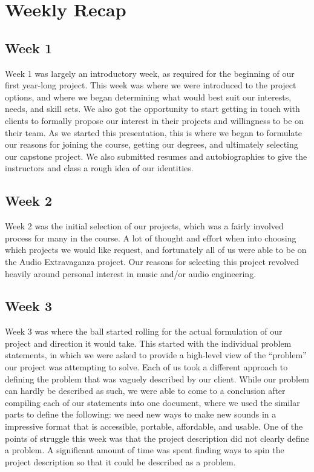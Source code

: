 \section{Weekly Recap}
    \subsection{Week 1}
        Week 1 was largely an introductory week, as required for the beginning of our first year-long project.
        This week was where we were introduced to the project options, and where we began determining what would best suit our interests, needs, and skill sets.
        We also got the opportunity to start getting in touch with clients to formally propose our interest in their projects and willingness to be on their team.
        As we started this presentation, this is where we began to formulate our reasons for joining the course, getting our degrees, and ultimately selecting our capstone project.
        We also submitted resumes and autobiographies to give the instructors and class a rough idea of our identities. 
    \subsection{Week 2}
        Week 2 was the initial selection of our projects, which was a fairly involved process for many in the course.
        A lot of thought and effort when into choosing which projects we would like request, and fortunately all of us were able to be on the Audio Extravaganza project.
        Our reasons for selecting this project revolved heavily around personal interest in music and/or audio engineering.
    \subsection{Week 3}
        Week 3 was where the ball started rolling for the actual formulation of our project and direction it would take.
        This started with the individual problem statements, in which we were asked to provide a high-level view of the “problem” our project was attempting to solve.
        Each of us took a different approach to defining the problem that was vaguely described by our client.
        While our problem can hardly be described as such, we were able to come to a conclusion after compiling each of our statements into one document, where we used the similar parts to define the following: we need new ways to make new sounds in a impressive format that is accessible, portable, affordable, and usable.
        One of the points of struggle this week was that the project description did not clearly define a problem.
        A significant amount of time was spent finding ways to spin the project description so that it could be described as a problem.

